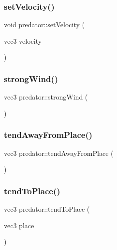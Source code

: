 \subsubsection{\texorpdfstring{set\+Velocity()}{setVelocity()}}
{\footnotesize\ttfamily void predator\+::set\+Velocity (\begin{DoxyParamCaption}\item[{vec3}]{velocity }\end{DoxyParamCaption})}

\mbox{\label{classpredator_af100da4595acd9a683706c6eb4b8fca5}} 
\subsubsection{\texorpdfstring{strong\+Wind()}{strongWind()}}
{\footnotesize\ttfamily vec3 predator\+::strong\+Wind (\begin{DoxyParamCaption}{ }\end{DoxyParamCaption})}

\mbox{\label{classpredator_a2977439f6325236d944f4b9ad3d67161}} 
\subsubsection{\texorpdfstring{tend\+Away\+From\+Place()}{tendAwayFromPlace()}}
{\footnotesize\ttfamily vec3 predator\+::tend\+Away\+From\+Place (\begin{DoxyParamCaption}{ }\end{DoxyParamCaption})}

\mbox{\label{classpredator_a777cf9d960d012607f0ac0f8ca711564}} 
\subsubsection{\texorpdfstring{tend\+To\+Place()}{tendToPlace()}}
{\footnotesize\ttfamily vec3 predator\+::tend\+To\+Place (\begin{DoxyParamCaption}\item[{vec3}]{place }\end{DoxyParamCaption})}

